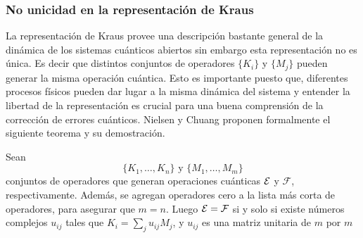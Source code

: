 \subsubsection{No unicidad en la representación de Kraus} %
 La representación de Kraus provee una descripción bastante general de la
dinámica de los sistemas cuánticos abiertos sin embargo esta representación no
es única. Es decir que distintos conjuntos de operadores $\{K_i\}$ y $\{M_j\}$
pueden generar la misma operación cuántica. Esto es importante puesto que,
diferentes procesos físicos pueden dar lugar a la misma dinámica del sistema y
entender la libertad de la representación es crucial para una buena comprensión
de la corrección de errores cuánticos. Nielsen y Chuang
{\cite{nielsen_chuang_2010}} proponen formalmente el siguiente teorema y su demostración.


\begin{theorem}\label{Libertad_unitaria}
Sean \[\{K_1,\ldots,K_n\} \text{ y } \{M_1,\ldots , M_m\}\] conjuntos de
operadores que generan operaciones cuánticas $\mathcal{E}$ y $\mathcal{F}$,
respectivamente. Además, se agregan operadores cero a la lista más corta de operadores, para asegurar que $m=n$. Luego $\mathcal{E}=\mathcal{F}$
si y solo si existe números complejos $u_{ij}$ tales que $K_i=\sum_j
u_{ij}M_j$, y $u_{ij}$ es una matriz
unitaria de $m$ por $m$
\end{theorem}

